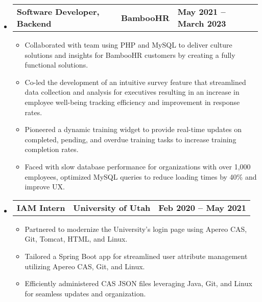 \documentclass[letterpaper,11pt]{article}
\begin{document}
\begin{itemize}[leftmargin=0.15in, itemsep=0pt, parsep=0pt, label={}]
	\item{
	            \begin{tabu} to \dimexpr\textwidth-0.15in {X[l] X[c] X[r]}
		            \textbf{Software Developer, Backend} & \textbf{BambooHR} & \textbf{May 2021 -- March 2023} \\
	            \end{tabu}
	            \begin{itemize}[label=$\bullet$]
		            \item{Collaborated with team using PHP and MySQL to deliver culture solutions and insights for BambooHR customers by creating a fully functional solutions.}
		            \item{Co-led the development of an intuitive survey feature that streamlined data collection and analysis for executives resulting in an increase in employee well-being tracking efficiency and improvement in response rates.}
		            \item{Pioneered a dynamic training widget to provide real-time updates on completed, pending, and overdue training tasks to increase training completion rates.}
		            \item{Faced with slow database performance for organizations with over 1,000 employees, optimized MySQL queries to reduce loading times by 40\% and improve UX.}
	            \end{itemize}
	      }

	\item{
	            \begin{tabu} to \dimexpr\textwidth-0.15in {X[l] X[c] X[r]}
		            \textbf{IAM Intern} & \textbf{University of Utah} & \textbf{Feb 2020 -- May 2021} \\
	            \end{tabu}

	            \begin{itemize}[label=$\bullet$]
		            \item{Partnered to modernize the University’s login page using Apereo CAS, Git, Tomcat, HTML, and Linux.}
		            \item{Tailored a Spring Boot app for streamlined user attribute management utilizing Apereo CAS, Git, and Linux.}
		            \item{ Efficiently administered CAS JSON files leveraging Java, Git, and Linux for seamless updates and organization.}
	            \end{itemize}
	      }


\end{itemize}
\end{document}
